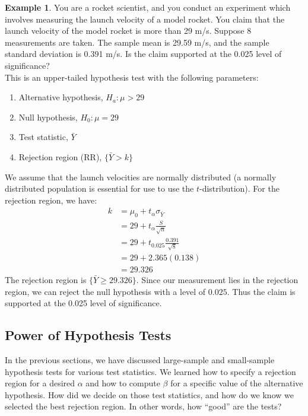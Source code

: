 \documentclass[12pt]{article}
\theoremstyle{definition}
\newtheorem*{example}{Example}
\theoremstyle{remark}
\begin{document}
\begin{example}You are a rocket scientist, and you conduct an experiment which involves measuring the launch velocity of a model rocket. You claim that the launch velocity of the model rocket is more than 29 m/s. Suppose 8 measurements are taken. The sample mean is 29.59 m/s, and the sample standard deviation is 0.391 m/s. Is the claim supported at the 0.025 level of significance?\\

This is an upper-tailed hypothesis test with the following parameters:
\begin{enumerate}
\item Alternative hypothesis, $H_a: \mu > 29$
\item Null hypothesis, $H_0: \mu = 29$
\item Test statistic, $\bar{Y}$
\item Rejection region (RR), $\{ \bar{Y} > k \}$
\end{enumerate}
We assume that the launch velocities are normally distributed (a normally distributed population is essential for use to use the $t$-distribution). For the rejection region, we have:
\begin{align*}
k &= \mu_0 + t_\alpha \sigma_{\bar{Y}} \\
&= 29 + t_\alpha \frac{S}{\sqrt{n}} \\
&= 29 + t_{0.025} \frac{0.391}{\sqrt{8}} \\
&= 29 + 2.365 ( 0.138 ) \\
&= 29.326
\end{align*}
The rejection region is $\{\bar{Y} \geq 29.326\}$. Since our measurement lies in the rejection region, we can reject the null hypothesis with a level of $0.025$. Thus the claim is supported at the 0.025 level of significance.
\end{example}

\subsection{Power of Hypothesis Tests}
In the previous sections, we have discussed large-sample and small-sample hypothesis tests for various test statistics. We learned how to specify a rejection region for a desired $\alpha$ and how to compute $\beta$ for a specific value of the alternative hypothesis. How did we decide on those test statistics, and how do we know we selected the best rejection region. In other words, how ``good'' are the tests?\\
\end{document}
